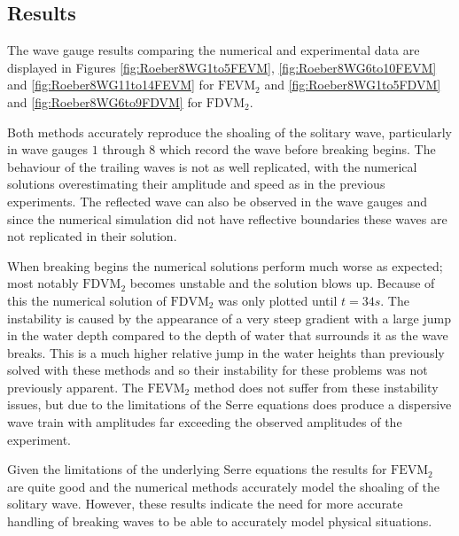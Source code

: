\subsection{Results}

The wave gauge results comparing the numerical and experimental data are displayed in Figures \ref{fig:Roeber8WG1to5FEVM}, \ref{fig:Roeber8WG6to10FEVM} and \ref{fig:Roeber8WG11to14FEVM} for $\text{FEVM}_2$ and \ref{fig:Roeber8WG1to5FDVM} and \ref{fig:Roeber8WG6to9FDVM} for $\text{FDVM}_2$.

Both methods accurately reproduce the shoaling of the solitary wave, particularly in wave gauges $1$ through $8$ which record the wave before breaking begins. The behaviour of the trailing waves is not as well replicated, with the numerical solutions overestimating their amplitude and speed as in the previous experiments. The reflected wave can also be observed in the wave gauges and since the numerical simulation did not have reflective boundaries these waves are not replicated in their solution.

When breaking begins the numerical solutions perform much worse as expected; most notably $\text{FDVM}_2$ becomes unstable and the solution blows up. Because of this the numerical solution of $\text{FDVM}_2$ was only plotted until $t = 34s$. The instability is caused by the appearance of a very steep gradient with a large jump in the water depth compared to the depth of water that surrounds it as the wave breaks. This is a much higher relative jump in the water heights than previously solved with these methods \cite{Pitt-2018-61} and so their instability for these problems was not previously apparent. The $\text{FEVM}_2$ method does not suffer from these instability issues, but due to the limitations of the Serre equations does produce a dispersive wave train with amplitudes far exceeding the observed amplitudes of the experiment. 

Given the limitations of the underlying Serre equations the results for $\text{FEVM}_2$ are quite good and the numerical methods accurately model the shoaling of the solitary wave. However, these results indicate the need for more accurate handling of breaking waves to be able to accurately model physical situations. 

